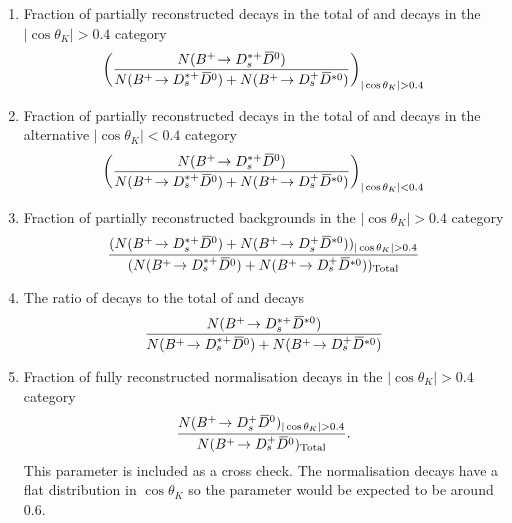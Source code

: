 \begin{enumerate}
\item Fraction of partially reconstructed \decay{\Bp}{\Dssp\Dzb} decays in the total of \decay{\Bp}{\Dssp\Dzb} and \decay{\Bp}{\Dsp\Dstarzb} decays in the $|\cos\theta_{K}|>0.4$ category
\begin{equation}
\left(\frac{N(\decay{\Bp}{\Dssp\Dzb})}{N(\decay{\Bp}{\Dssp\Dzb})+N(\decay{\Bp}{\Dsp\Dstarzb})}\right)_{|\cos\theta_{K}|>0.4}   
\end{equation}
\item Fraction of partially reconstructed \decay{\Bp}{\Dssp\Dzb} decays in the total of \decay{\Bp}{\Dssp\Dzb} and \decay{\Bp}{\Dsp\Dstarzb} decays in the alternative $|\cos\theta_{K}|<0.4$ category
\begin{equation}
\left(\frac{N({{{B}^+}}\!\rightarrow {\ensuremath{{D}^{*+}_{s}}}{\ensuremath{{\kern 0.2em\overline{\kern -0.2em D}{}}{}^0}})}{N({{{B}^+}}\!\rightarrow {\ensuremath{{D}^{*+}_{s}}}{\ensuremath{{\kern 0.2em\overline{\kern -0.2em D}{}}{}^0}})+N({{{B}^+}}\!\rightarrow {\ensuremath{{D}^+_{s}}}{\ensuremath{{\kern 0.2em\overline{\kern -0.2em D}{}}{}^{*0}}})}\right)_{|\cos\theta_{K}|<0.4}   
\end{equation}
\item Fraction of partially reconstructed backgrounds in the $|\cos\theta_{K}|>0.4$ category
\begin{equation}
\frac{(N(\decay{\Bp}{\Dssp\Dzb})+N(\decay{\Bp}{\Dsp\Dstarzb}))_{|\cos\theta_{K}|>0.4}}{(N(\decay{\Bp}{\Dssp\Dzb})+N(\decay{\Bp}{\Dsp\Dstarzb}))_{\text{Total}}}   
\end{equation}
\item The ratio of \decay{\Bp}{\Dssp\Dstarzb} decays to the total of \decay{\Bp}{\Dssp\Dzb} and \decay{\Bp}{\Dsp\Dstarzb} decays
\begin{equation}\frac{N({{{B}^+}}\!\rightarrow {\ensuremath{{D}^{*+}_{s}}}{\ensuremath{{\kern 0.2em\overline{\kern -0.2em D}{}}{}^{*0}}})}{N({{{B}^+}}\!\rightarrow {\ensuremath{{D}^{*+}_{s}}}{\ensuremath{{\kern 0.2em\overline{\kern -0.2em D}{}}{}^0}})+N({{{B}^+}}\!\rightarrow {\ensuremath{{D}^+_{s}}}{\ensuremath{{\kern 0.2em\overline{\kern -0.2em D}{}}{}^{*0}}})}   
\end{equation}
\item Fraction of fully reconstructed normalisation decays in the $|\cos\theta_{K}|>0.4$ category
\begin{equation}
\frac{N(\decay{\Bp}{\Dsp\Dzb})_{|\cos\theta_{K}|>0.4}}{N(\decay{\Bp}{\Dsp\Dzb})_{\text{Total}}}.   
\end{equation}
This parameter is included as a cross check. The normalisation decays have a flat distribution in $\cos\theta_{K}$ so the parameter would be expected to be around $0.6$. 
\end{enumerate}



